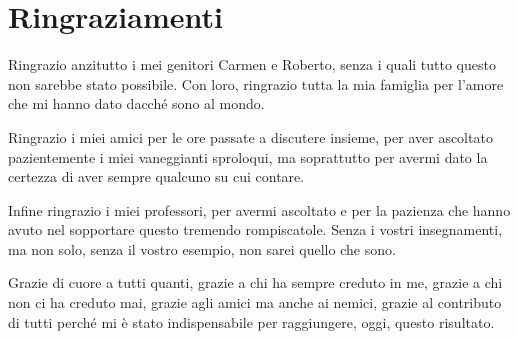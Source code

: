 \documentclass[12pt,a4paper,openright,twoside]{report}
\begin{document}
\clearpage{\pagestyle{empty}\cleardoublepage}




\clearpage{\pagestyle{empty}\cleardoublepage}
\chapter*{Ringraziamenti}
\thispagestyle{empty}

Ringrazio anzitutto i mei genitori Carmen e Roberto, senza i quali tutto questo non sarebbe stato possibile. Con loro, ringrazio tutta la mia famiglia per l'amore che mi hanno dato dacch\'e sono al mondo.

Ringrazio i miei amici per le ore passate a discutere insieme, per aver ascoltato pazientemente i miei vaneggianti sproloqui, ma soprattutto per avermi dato la certezza di aver sempre qualcuno su cui contare.

Infine ringrazio i miei professori, per avermi ascoltato e per la pazienza che hanno avuto nel sopportare questo tremendo rompiscatole. Senza i vostri insegnamenti, ma non solo, senza il vostro esempio, non sarei quello che sono.

Grazie di cuore a tutti quanti, grazie a chi ha sempre creduto in me, grazie a chi non ci ha creduto mai, grazie agli amici ma anche ai nemici, grazie al contributo di tutti perch\'e mi \`e stato indispensabile per raggiungere, oggi, questo risultato.
\end{document}
